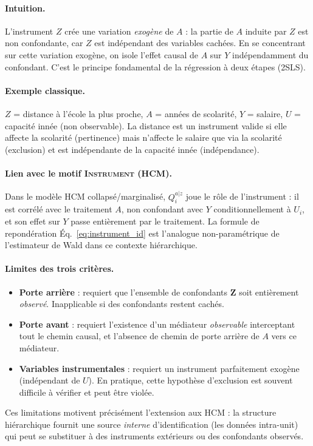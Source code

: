 \documentclass[11pt,a4paper]{article}
\begin{document}
\paragraph{Intuition.}
L'instrument $Z$ crée une variation \emph{exogène} de $A$ : la partie de $A$ induite par $Z$ est non confondante, car $Z$ est indépendant des variables cachées.
En se concentrant sur cette variation exogène, on isole l'effet causal de $A$ sur $Y$ indépendamment du confondant.
C'est le principe fondamental de la régression à deux étapes (2SLS).

\paragraph{Exemple classique.}
$Z$ = distance à l'école la plus proche, $A$ = années de scolarité, $Y$ = salaire, $U$ = capacité innée (non observable).
La distance est un instrument valide si elle affecte la scolarité (pertinence) mais n'affecte le salaire que via la scolarité (exclusion) et est indépendante de la capacité innée (indépendance).

\paragraph{Lien avec le motif \textsc{Instrument} (HCM).}
Dans le modèle HCM collapsé/marginalisé, $Q^{a|z}_i$ joue le rôle de l'instrument : il est corrélé avec le traitement $A$, non confondant avec $Y$ conditionnellement à $U_i$, et son effet sur $Y$ passe entièrement par le traitement.
La formule de repondération Éq.~\eqref{eq:instrument_id} est l'analogue non-paramétrique de l'estimateur de Wald dans ce contexte hiérarchique.

\paragraph{Limites des trois critères.}
\begin{itemize}
  \item \textbf{Porte arrière} : requiert que l'ensemble de confondants $\mathbf{Z}$ soit entièrement \emph{observé}. Inapplicable si des confondants restent cachés.
  \item \textbf{Porte avant} : requiert l'existence d'un médiateur \emph{observable} interceptant tout le chemin causal, et l'absence de chemin de porte arrière de $A$ vers ce médiateur.
  \item \textbf{Variables instrumentales} : requiert un instrument parfaitement exogène (indépendant de $U$). En pratique, cette hypothèse d'exclusion est souvent difficile à vérifier et peut être violée.
\end{itemize}
Ces limitations motivent précisément l'extension aux HCM : la structure hiérarchique fournit une source \emph{interne} d'identification (les données intra-unit) qui peut se substituer à des instruments extérieurs ou des confondants observés.
\end{document}
